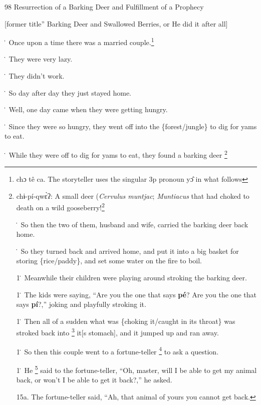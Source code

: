 
98 Resurrection of a Barking Deer and Fulfillment of a Prophecy

[former title'' Barking Deer and Swallowed Berries, or He did it after all]

\. Once upon a time there was a married couple.\footnote{chɔ  tê  ca. The storyteller uses the singular 3p pronoun yɔ̂ in what follows}

\. They were very lazy.

\. They didn't work.

\. So day after day they just stayed home.

\. Well, one day came when they were getting hungry.

\. Since they were so hungry, they went off into the \{forest/jungle\} to dig for
yams to eat.

\. While they were off to dig for yams to eat, they found a barking deer \footnote{chɨ-pí-qwɛ̀ʔ: A small deer (\textit{Cervulus muntjac}; \textit{Muntiacus} that
had choked to death on a wild gooseberry!\footnote{qhâʔ-cÁ-šī: \textit{Sesbanea sesbans }or \textit{Phyllanthus emblica}.}

\. So then the two of them, husband and wife, carried the barking deer back home.

\. So they turned back and arrived home, and put it into a big basket for storing
\{rice/paddy\}, and set some water on the fire to boil.

1\. Meanwhile their children were playing around stroking the barking deer.

1\. The kids were saying, ``Are you the one that says \textbf{pé}? Are you the
one that says \textbf{pí}?,'' joking and playfully stroking it.

1\. Then all of a sudden what was \{choking it/caught in its throat\} was stroked
back into \footnote{This complex verbal idea (stroke back into) is conveyed by a three-verb concatenation:} it[s stomach], and it jumped up and ran away.

1\. So then this couple went to a fortune-teller \footnote{mɔ́ `teacher; master; expert; possessor of occult knowledge' \texttt{<} Tai} to ask a question.

1\. He \footnote{The pronoun is not expressed, but the context makes it clear that it is the} said to the fortune-teller, ``Oh, master, will I be able to get my animal
back, or won't I be able to get it back?,'' he asked.

15a. The fortune-teller said, ``Ah, that animal of yours you cannot get back.

}
